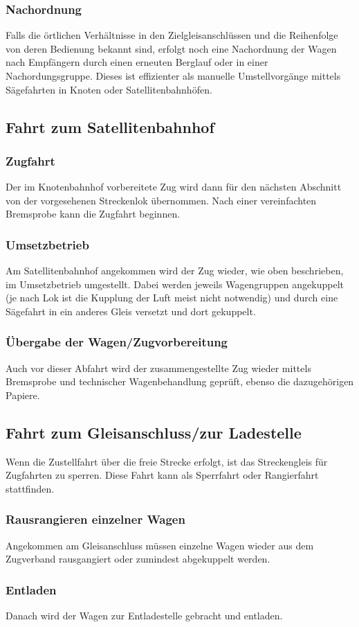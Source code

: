\subsubsection{Nachordnung}\label{sec:Nachordnung}
Falls die örtlichen Verhältnisse in den Zielgleisanschlüssen und die Reihenfolge von deren Bedienung bekannt sind, erfolgt noch eine Nachordnung der Wagen nach Empfängern durch einen erneuten Berglauf oder in einer Nachordungsgruppe. Dieses ist effizienter als manuelle Umstellvorgänge mittels Sägefahrten in Knoten oder Satellitenbahnhöfen.

\subsection{Fahrt zum Satellitenbahnhof}
\subsubsection{Zugfahrt}\label{sec:Zugfahrt2}
Der im Knotenbahnhof vorbereitete Zug wird dann für den nächsten Abschnitt von der vorgesehenen Streckenlok übernommen. Nach einer vereinfachten \gls{Bremsprobe} kann die \gls{Zugfahrt} beginnen.\par
\subsubsection{Umsetzbetrieb}\label{sec:Umsetzbetrieb}
Am Satellitenbahnhof angekommen wird der Zug wieder, wie oben beschrieben, im Umsetzbetrieb umgestellt. Dabei werden
jeweils Wagengruppen angekuppelt (je nach Lok ist die Kupplung der Luft meist nicht notwendig) und durch eine Sägefahrt in ein anderes Gleis versetzt und dort gekuppelt.
\subsubsection{Übergabe der Wagen/Zugvorbereitung}
Auch  vor  dieser  Abfahrt  wird der  zusammengestellte  Zug wieder mittels \gls{Bremsprobe} und technischer Wagenbehandlung geprüft, ebenso die dazugehörigen Papiere.

\subsection{Fahrt zum Gleisanschluss/zur Ladestelle}\label{sec:FahrtGA}
Wenn die Zustellfahrt über die freie Strecke erfolgt, ist das Streckengleis für Zugfahrten zu sperren. Diese Fahrt kann als Sperrfahrt oder Rangierfahrt stattfinden.
\subsubsection{Rausrangieren einzelner Wagen}\label{sec:RausrangWagen}
Angekommen am \gls{Gleisanschluss} müssen einzelne Wagen wieder aus dem Zugverband rausgangiert oder zumindest abgekuppelt werden.
\subsubsection{Entladen}
Danach wird der Wagen zur Entladestelle gebracht und entladen.